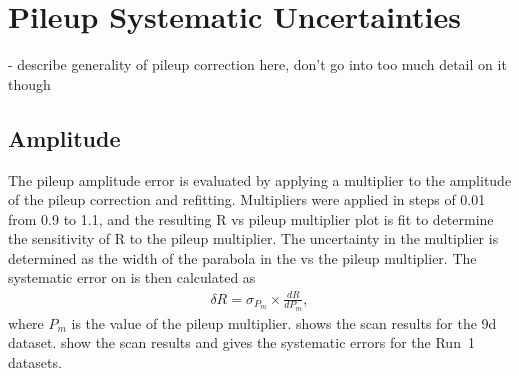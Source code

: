 
\graphicspath{{Body/Figures/Pileup/}{Body/Figures/Pileup/Amplitude/}{Body/Figures/Pileup/TimeShift/}{Body/Figures/Pileup/EnergyModel/}{Body/Figures/Pileup/TriplePileup/}{Body/Figures/Pileup/RateError/}}

\section{Pileup Systematic Uncertainties}


- describe generality of pileup correction here, don't go into too much detail on it though



\subsection{Amplitude}

The pileup amplitude error is evaluated by applying a multiplier to the amplitude of the pileup correction and refitting. Multipliers were applied in steps of 0.01 from 0.9 to 1.1, and the resulting R vs pileup multiplier plot is fit to determine the sensitivity of R to the pileup multiplier. The uncertainty in the multiplier is determined as the width of the parabola in the \chisq vs the pileup multiplier. The systematic error on \R is then calculated as 
    \begin{align}
        \delta R = \sigma_{P_{m}} \times \frac{dR}{dP_{m}},
    \end{align}
where $P_{m}$ is the value of the pileup multiplier.  shows the scan results for the 9d dataset.  show the scan results and  gives the systematic errors for the Run~1 datasets.






